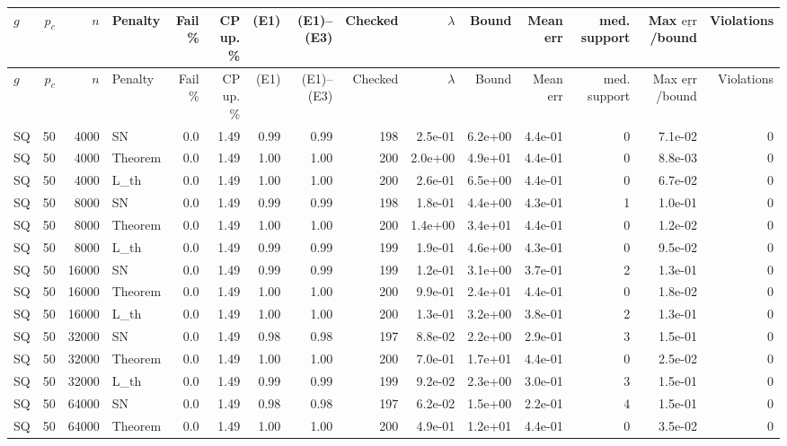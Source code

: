 \begin{tabular}{lrrlrrrrrrrrrrr}
\hline
$g$ & $p_c$ & $n$ & Penalty & Fail \% & CP up. \% & (E1) & (E1)--(E3) & Checked & $\lambda$ & Bound & Mean err & med. support & Max $\underline{\mathrm{err}}$/bound & Violations \\
\hline
\endfirsthead
\hline
$g$ & $p_c$ & $n$ & Penalty & Fail \% & CP up. \% & (E1) & (E1)--(E3) & Checked & $\lambda$ & Bound & Mean err & med. support & Max $\underline{\mathrm{err}}$/bound & Violations \\
\hline
\endhead
SQ & 50 & 4000 & SN & 0.0 & 1.49 & 0.99 & 0.99 & 198 & 2.5e-01 & 6.2e+00 & 4.4e-01 & 0 & 7.1e-02 & 0 \\
SQ & 50 & 4000 & Theorem & 0.0 & 1.49 & 1.00 & 1.00 & 200 & 2.0e+00 & 4.9e+01 & 4.4e-01 & 0 & 8.8e-03 & 0 \\
SQ & 50 & 4000 & L\_th & 0.0 & 1.49 & 1.00 & 1.00 & 200 & 2.6e-01 & 6.5e+00 & 4.4e-01 & 0 & 6.7e-02 & 0 \\
SQ & 50 & 8000 & SN & 0.0 & 1.49 & 0.99 & 0.99 & 198 & 1.8e-01 & 4.4e+00 & 4.3e-01 & 1 & 1.0e-01 & 0 \\
SQ & 50 & 8000 & Theorem & 0.0 & 1.49 & 1.00 & 1.00 & 200 & 1.4e+00 & 3.4e+01 & 4.4e-01 & 0 & 1.2e-02 & 0 \\
SQ & 50 & 8000 & L\_th & 0.0 & 1.49 & 0.99 & 0.99 & 199 & 1.9e-01 & 4.6e+00 & 4.3e-01 & 0 & 9.5e-02 & 0 \\
SQ & 50 & 16000 & SN & 0.0 & 1.49 & 0.99 & 0.99 & 199 & 1.2e-01 & 3.1e+00 & 3.7e-01 & 2 & 1.3e-01 & 0 \\
SQ & 50 & 16000 & Theorem & 0.0 & 1.49 & 1.00 & 1.00 & 200 & 9.9e-01 & 2.4e+01 & 4.4e-01 & 0 & 1.8e-02 & 0 \\
SQ & 50 & 16000 & L\_th & 0.0 & 1.49 & 1.00 & 1.00 & 200 & 1.3e-01 & 3.2e+00 & 3.8e-01 & 2 & 1.3e-01 & 0 \\
SQ & 50 & 32000 & SN & 0.0 & 1.49 & 0.98 & 0.98 & 197 & 8.8e-02 & 2.2e+00 & 2.9e-01 & 3 & 1.5e-01 & 0 \\
SQ & 50 & 32000 & Theorem & 0.0 & 1.49 & 1.00 & 1.00 & 200 & 7.0e-01 & 1.7e+01 & 4.4e-01 & 0 & 2.5e-02 & 0 \\
SQ & 50 & 32000 & L\_th & 0.0 & 1.49 & 0.99 & 0.99 & 199 & 9.2e-02 & 2.3e+00 & 3.0e-01 & 3 & 1.5e-01 & 0 \\
SQ & 50 & 64000 & SN & 0.0 & 1.49 & 0.98 & 0.98 & 197 & 6.2e-02 & 1.5e+00 & 2.2e-01 & 4 & 1.5e-01 & 0 \\
SQ & 50 & 64000 & Theorem & 0.0 & 1.49 & 1.00 & 1.00 & 200 & 4.9e-01 & 1.2e+01 & 4.4e-01 & 0 & 3.5e-02 & 0 \\

\end{tabular}
